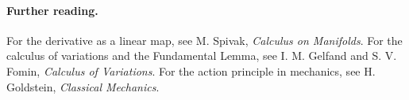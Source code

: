 \documentclass{article}
\begin{document}
\paragraph{Further reading.} For the derivative as a linear map, see
M. Spivak, {\it Calculus on Manifolds\/}. For the calculus of variations
and the Fundamental Lemma, see I. M. Gelfand and S. V. Fomin,
{\it Calculus of Variations\/}. For the action principle in mechanics, see
H. Goldstein, {\it Classical Mechanics\/}.
\end{document}
